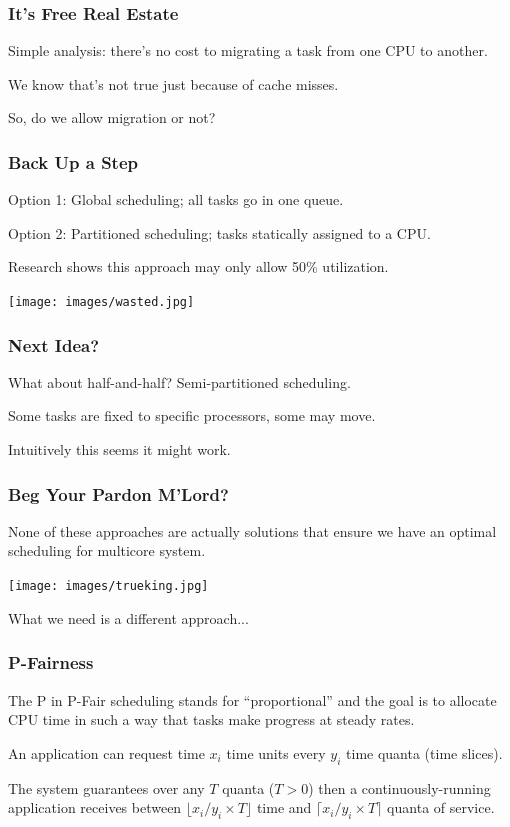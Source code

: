 \begin{frame}
\frametitle{It's Free Real Estate}

Simple analysis: there's no cost to migrating a task from one CPU to another.

We know that's not true just because of cache misses.

So, do we allow migration or not?

\end{frame}


\begin{frame}
\frametitle{Back Up a Step}

Option 1: Global scheduling; all tasks go in one queue.

Option 2: \alert{Partitioned} scheduling; tasks statically assigned to a CPU.

Research shows this approach may only allow 50\% utilization.

\begin{center}
	\texttt{[image: images/wasted.jpg]}
\end{center}

\end{frame}

\begin{frame}
\frametitle{Next Idea?}

What about half-and-half? \alert{Semi-partitioned} scheduling.

Some tasks are fixed to specific processors, some may move.

Intuitively this seems it might work.

\end{frame}

\begin{frame}
\frametitle{Beg Your Pardon M'Lord?}

None of these approaches are actually solutions that ensure we have an optimal scheduling for multicore system. 

\begin{center}
	\texttt{[image: images/trueking.jpg]}
\end{center}

What we need is a different approach...

\end{frame}

\begin{frame}
\frametitle{P-Fairness}

The P in P-Fair scheduling stands for ``proportional'' and the goal is to allocate CPU time in such a way that tasks make progress at steady rates.

An application can request time $x_i$ time units every $y_i$ time quanta (time slices).

The system guarantees over any $T$ quanta ($T>0$) then a continuously-running application receives between $\lfloor x_i/y_i \times T\rfloor$ time and $\lceil x_i/y_i \times T\rceil$ quanta of service.

\end{frame}

